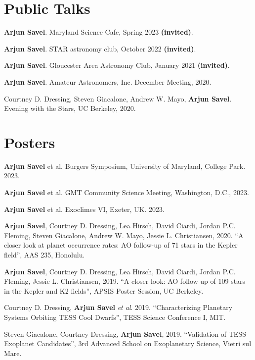\documentclass[letterpaper,10.5pt]{article}
\newcommand{\resumeSubHeadingListStart}{\begin{itemize}[leftmargin=*]}
\newcommand{\shorterSection}[1]{\vspace{-10pt}\section{#1}}
\begin{document}
\shorterSection{Public Talks}
\begin{list}{}{\cvlist}
\item[{\color{numcolor}\scriptsize5}] \textbf{Arjun Savel}. Maryland Science Cafe, Spring 2023 \textbf{(invited)}.
\item[{\color{numcolor}\scriptsize4}] \textbf{Arjun Savel}. STAR astronomy club, October 2022 \textbf{(invited)}.
\item[{\color{numcolor}\scriptsize3}] \textbf{Arjun Savel}. Gloucester Area Astronomy Club, January 2021 \textbf{(invited)}.
\item[{\color{numcolor}\scriptsize2}] \textbf{Arjun Savel}. Amateur Astronomers, Inc. December Meeting, 2020.
\item[{\color{numcolor}\scriptsize1}] Courtney D. Dressing, Steven Giacalone, Andrew W. Mayo, \textbf{Arjun Savel}. Evening with the Stars, UC Berkeley, 2020.
\end{list}


\shorterSection{Posters}
\small
  \begin{list}{}{\cvlist}
  \item[{\color{numcolor}\scriptsize7}]\textbf{Arjun Savel} et al. Burgers Symposium, University of Maryland, College Park. 2023.
  
  \item[{\color{numcolor}\scriptsize6}]\textbf{Arjun Savel} et al. GMT Community Science Meeting, Washington, D.C., 2023.
  
  \item[{\color{numcolor}\scriptsize5}]\textbf{Arjun Savel} et al. Exoclimes VI, Exeter, UK. 2023.
  
  \item[{\color{numcolor}\scriptsize4}]\textbf{Arjun Savel}, Courtney D. Dressing, Lea Hirsch, David Ciardi, Jordan P.C. Fleming, Steven Giacalone, Andrew W. Mayo, Jessie L. Christiansen, 2020. “A closer look at planet occurrence rates: AO follow-up of 71 stars in the Kepler field”, AAS 235, Honolulu.

  \item[{\color{numcolor}\scriptsize3}] \textbf{Arjun Savel}, Courtney D. Dressing, Lea Hirsch, David Ciardi, Jordan P.C. Fleming, Jessie L. Christiansen, 2019. “A closer look: AO follow-up of 109 stars in the Kepler and K2 fields”, APSIS Poster Session, UC Berkeley.

\item[{\color{numcolor}\scriptsize2}] Courtney D. Dressing, \textbf{Arjun Savel} \textit{et al}. 2019. “Characterizing Planetary Systems Orbiting TESS Cool Dwarfs”, TESS Science Conference I, MIT.

\item[{\color{numcolor}\scriptsize1}] Steven Giacalone, Courtney Dressing, \textbf{Arjun Savel}, 2019. “Validation of TESS Exoplanet Candidates”, 3rd Advanced School on Exoplanetary Science, Vietri sul Mare.

  \end{list}
\end{document}
